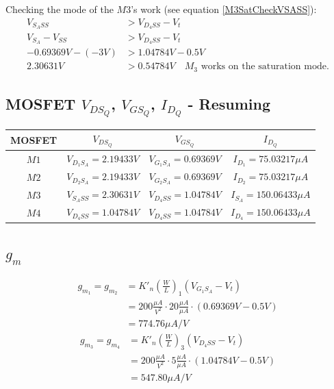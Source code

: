 \documentclass[10pt,a4paper]{book}
\begin{document}
Checking the mode of the $M3$'s work (see equation \ref{M3SatCheckVSASS}):
\begin{align}
V_{{S_A}SS} &> V_{{D_4}SS} - V_t\\
V_{S_A} - V_{SS} &> V_{{D_4}SS} - V_t\\
-0.69369V - (-3V) &> 1.04784V - 0.5V\\
2.30631V &> 0.54784V \quad M_3\text{ works on the saturation mode.}
\end{align}

\subsection{MOSFET $V_{DS_Q}$, $V_{GS_Q}$, $I_{D_Q}$ - Resuming}
\begin{center}
\begin{tabular}{|c|c|c|c|}
\hline
MOSFET & $V_{DS_Q}$ & $V_{GS_Q}$ & $I_{D_Q}$ \\
\hline
$M1$ & $V_{D_1S_A} = 2.19433V$ & $V_{G_1S_A} = 0.69369V$ & $I_{D_1} = 75.03217\mu A$ \\
\hline
$M2$ & $V_{D_2S_A} = 2.19433V$ & $V_{G_2S_A} = 0.69369V$ & $I_{D_2} = 75.03217\mu A$ \\
\hline
$M3$ & $V_{S_ASS} = 2.30631V$ & $V_{D_4SS} = 1.04784V$ & $I_{S_A} = 150.06433 \mu A$ \\
\hline
$M4$ & $V_{D_4SS} = 1.04784V$ & $V_{D_4SS} = 1.04784V$ & $I_{D_4} = 150.06433 \mu A$ \\
\hline
\end{tabular}
\end{center}

\subsection{$g_m$}
\begin{align}
g_{m_1} = g_{m_2} &= K'_n \left(\frac{W}{L}\right)_1 (V_{G_1S_A} - V_t)\\
&= 200 \frac{\mu A}{V^2} \cdot 20 \frac{\mu A}{\mu A} \cdot (0.69369V-0.5V)\\
&= 774.76 \mu A/V
\end{align}
\begin{align}
g_{m_3} = g_{m_4} &= K'_n \left(\frac{W}{L}\right)_3 (V_{D_4SS} - V_t)\\
&= 200 \frac{\mu A}{V^2} \cdot 5 \frac{\mu A}{\mu A} \cdot (1.04784V-0.5V)\\
&= 547.80 \mu A/V
\end{align}
\end{document}
